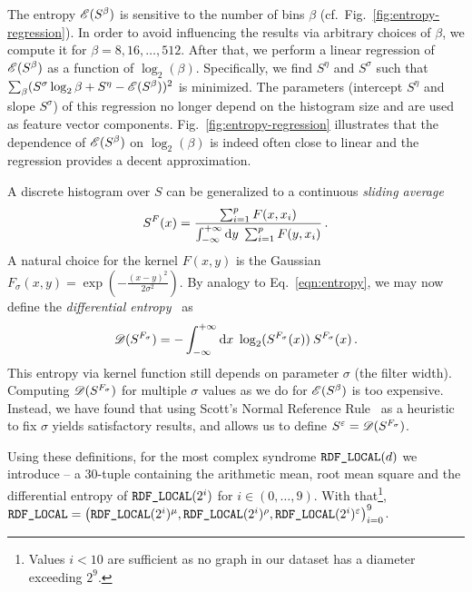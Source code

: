 The entropy $\Entropy(S^\beta)$ is sensitive to the number of bins $\beta$ (cf.~Fig.~\ref{fig:entropy-regression}).  In
order to avoid influencing the results via arbitrary choices of $\beta$, we compute it for $\beta=8,16,\ldots,512$.
After that, we perform a linear regression of $\Entropy(S^\beta)$ as a function of $\log_2(\beta)$.  Specifically, we
find $S^\eta$ and $S^\sigma$ such that $\sum_{\beta}(S^\sigma \log_2\beta+S^\eta-\Entropy(S^\beta))^2$ is minimized.
The parameters (intercept $S^\eta$ and slope $S^\sigma$) of this regression no longer depend on the histogram size and
are used as feature vector components.  Fig.~\ref{fig:entropy-regression} illustrates that the dependence of
$\Entropy(S^\beta)$ on $\log_2(\beta)$ is indeed often close to linear and the regression provides a decent
approximation.

A discrete histogram over $S$ can be generalized to a continuous \emph{sliding average}
\begin{equation}
  S^F(x) = \frac{\sum_{i=1}^{p} F(x,x_i)}{\int_{-\infty}^{+\infty} \mathrm{d}y\kern0.3em \sum_{i=1}^p F(y,x_i)}
  \,.
\end{equation}
A natural choice for the kernel $F(x,y)$ is the Gaussian $F_\sigma(x,y)=\exp\left(-\frac{(x - y)^2}{2\sigma^2}\right)$.
By analogy to Eq.~\ref{eqn:entropy}, we may now define the \emph{differential entropy}~\cite{Shannon1948} as
\begin{equation}
  \Entropy*(S^{F_\sigma}) = -\int_{-\infty}^{+\infty} \diff{x}\log_2(S^{F_\sigma}(x)) \: S^{F_\sigma}(x)
  \mathendpunct{.}
\end{equation}
This entropy via kernel function still depends on parameter $\sigma$ (the filter width).  Computing
$\Entropy*(S^{F_\sigma})$ for multiple $\sigma$ values as we do for $\Entropy(S^\beta)$ is too expensive.  Instead, we
have found that using Scott's Normal Reference Rule~\cite{Scott1979} as a heuristic to fix $\sigma$ yields satisfactory
results, and allows us to define $S^\epsilon = \Entropy*(S^{F_\sigma})$.

Using these definitions, for the most complex syndrome $\mbox{\text{\upshape\ttfamily RDF\_LOCAL}}(d)$ we introduce  -- a
$30$-tuple containing the arithmetic mean, root mean square and the differential entropy of $\mbox{\text{\upshape\ttfamily RDF\_LOCAL}}(2^i)$
for $i\in(0,\ldots,9)$.  With that\footnote{Values $i < 10$ are sufficient as no graph in our dataset has a diameter
  exceeding $2^9$.}, $\mbox{\text{\upshape\ttfamily RDF\_LOCAL}} = \left(\mbox{\texttt{RDF\_LOCAL}}(2^i)^\mu, \mbox{\texttt{RDF\_LOCAL}}(2^i)^\rho,
\mbox{\texttt{RDF\_LOCAL}}(2^i)^\varepsilon \right)_{i = 0}^9$.

